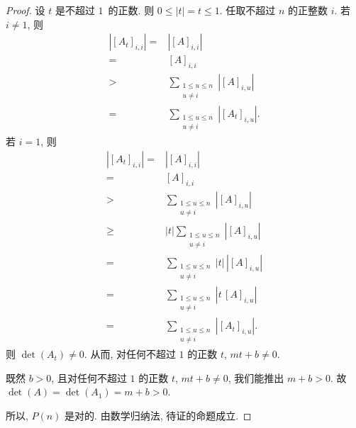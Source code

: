 \documentclass[../libro.tex]{subfiles}
\begin{document}
\begin{proof}
    设 \(t\) 是不超过 \(1\)~的正数.
    则 \(0 \leq |t| = t \leq 1\).
    任取不超过 \(n\) 的正整数 \(i\).
    若 \(i \neq 1\), 则
    \begin{align*}
        |[A_t]_{i,i}|
        = {} &
        |[A]_{i,i}|
        \\
        = {} &
        [A]_{i,i}
        \\
        > {} &
        \sum_{\substack{1 \leq u \leq n \\u \neq i}}
        {|[A]_{i,u}|}
        \\
        = {} &
        \sum_{\substack{1 \leq u \leq n \\u \neq i}}
        {|[A_t]_{i,u}|}.
    \end{align*}
    若 \(i = 1\), 则
    \begin{align*}
        |[A_t]_{i,i}|
        = {} &
        |[A]_{i,i}|
        \\
        = {} &
        [A]_{i,i}
        \\
        > {} &
        \sum_{\substack{1 \leq u \leq n \\ u \neq i}}
        {|[A]_{i,u}|}
        \\
        \geq {} &
        |t| \sum_{\substack{1 \leq u \leq n \\ u \neq i}}
        {|[A]_{i,u}|}
        \\
        = {} &
        \sum_{\substack{1 \leq u \leq n \\ u \neq i}}
        {|t|\, |[A]_{i,u}|}
        \\
        = {} &
        \sum_{\substack{1 \leq u \leq n \\ u \neq i}}
        {|t\, [A]_{i,u}|}
        \\
        = {} &
        \sum_{\substack{1 \leq u \leq n \\ u \neq i}}
        {|[A_t]_{i,u}|}.
    \end{align*}
    则 \(\det {(A_t)} \neq 0\).
    从而,
    对任何不超过 \(1\) 的正数 \(t\),
    \(mt + b \neq 0\).

    既然 \(b > 0\),
    且对任何不超过 \(1\) 的正数 \(t\),
    \(mt + b \neq 0\),
    我们能推出 \(m + b > 0\).
    故 \(\det {(A)} = \det {(A_1)} = m + b > 0\).

    所以, \(P(n)\) 是对的.
    由数学归纳法, 待证的命题成立.
\end{proof}


\end{document}
